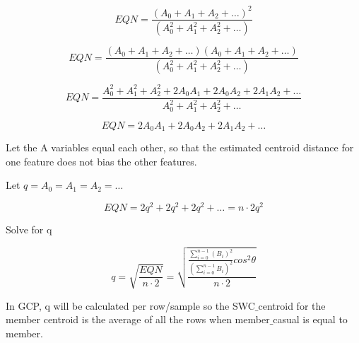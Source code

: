 \documentclass[11pt, onecolumn]{article}
\begin{document}
\begin{equation}
EQN  =   \frac{(A_0 + A_1 + A_2 + \ldots)^{2} }{(A_{0}^{2} + A_{1}^{2} + A_{2}^{2} + \ldots)} 
\end{equation}

\begin{equation}
EQN  =   \frac{(A_0 + A_1 + A_2 + \ldots)(A_0 + A_1 + A_2 + \ldots) }{(A_{0}^{2} + A_{1}^{2} + A_{2}^{2} + \ldots)} 
\end{equation}

\begin{equation}
EQN  =   \frac{A_{0}^{2} + A_{1}^{2} + A_{2}^{2} + 2A_{0}A_{1} + 2A_{0}A_{2} + 2A_{1}A_{2} + \ldots }{A_{0}^{2} + A_{1}^{2} + A_{2}^{2} + \ldots} 
\end{equation}

\begin{equation}
EQN  =  2A_{0}A_{1} + 2A_{0}A_{2} + 2A_{1}A_{2} + \ldots
\end{equation}

Let the A variables equal each other, so that the estimated centroid distance for one feature does not bias the other features. 

Let $q = A_0 = A_1 = A_2 = \ldots $ 

\begin{equation}
EQN  =  2q^{2} + 2q^{2} + 2q^{2} + \ldots = n \cdot 2q^{2}
\end{equation}

Solve for q

\begin{equation}
q  =  \sqrt{ \frac{ EQN }{ n \cdot 2 }} = \sqrt{ \frac{ \frac{ \sum^{n-1}_{i=0} (B_i)^{2}} { (\sum^{n-1}_{i=0} B_i)^{2} } cos^{2} \theta }{ n \cdot 2 }}
\end{equation}

In GCP, q will be calculated per row/sample so the SWC$\_$centroid for the member centroid is the average of all the rows when member$\_$casual is equal to member.
\end{document}
